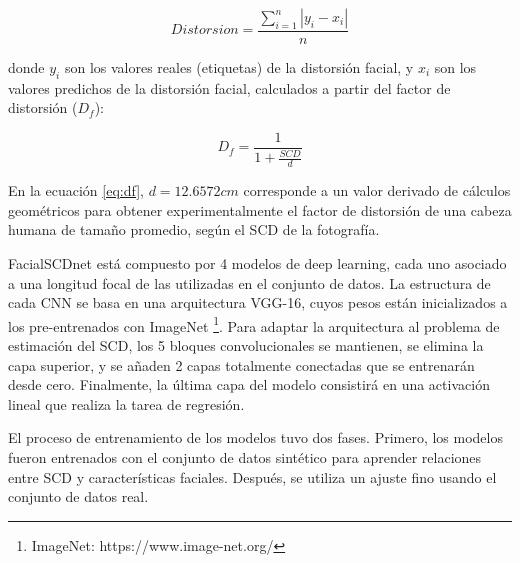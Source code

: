 \begin{equation}
	Distorsion = \frac{\sum_{i=1}^{n} |y_i - x_i|}{n}
\end{equation}

donde $y_i$ son los valores reales (etiquetas) de la distorsión facial, y $x_i$ son los valores predichos de la distorsión facial, calculados a partir del factor de distorsión ($D_f$):

\begin{equation}
	D_f = \frac{1}{1 + \frac{SCD}{d}}
	\label{eq:df}
\end{equation}

En la ecuación \ref{eq:df}, $d = 12.6572 cm$ corresponde a un valor derivado de cálculos geométricos \cite{23} para obtener experimentalmente el factor de distorsión de una cabeza humana de tamaño promedio, según el SCD de la fotografía.

FacialSCDnet está compuesto por 4 modelos de deep learning, cada uno asociado a una longitud focal de las utilizadas en el conjunto de datos. La estructura de cada CNN se basa en una arquitectura VGG-16, cuyos pesos están inicializados a los pre-entrenados con ImageNet \footnote{ImageNet: https://www.image-net.org/}. Para adaptar la arquitectura al problema de estimación del SCD, los 5 bloques convolucionales se mantienen, se elimina la capa superior, y se añaden 2 capas totalmente conectadas que se entrenarán desde cero. Finalmente, la última capa del modelo consistirá en una activación lineal que realiza la tarea de regresión.

El proceso de entrenamiento de los modelos tuvo dos fases. Primero, los modelos fueron entrenados con el conjunto de datos sintético para aprender relaciones entre SCD y características faciales. Después, se utiliza un ajuste fino usando el conjunto de datos real.




